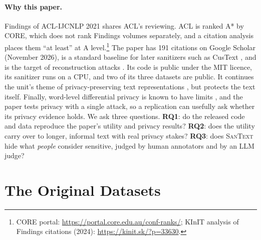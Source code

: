 \documentclass[11pt]{article}
\newcommand{\scholarcites}{191} %
\newcommand{\santext}{\textsc{SanText}}
\begin{document}
\paragraph{Why this paper.} Findings of ACL-IJCNLP 2021 shares ACL's reviewing. ACL is ranked A* by CORE, which does not rank Findings volumes separately, and a citation analysis places them ``at least'' at A level.\footnote{CORE portal: \url{https://portal.core.edu.au/conf-ranks/}; KInIT analysis of Findings citations (2024): \url{https://kinit.sk/?p=33630}.} The paper has \scholarcites{} citations on Google Scholar (November 2026), is a standard baseline for later sanitizers such as CusText \citep{chen-etal-2023-customized}, and is the target of reconstruction attacks \citep{tong-etal-2025-vulnerability}. Its code is public under the MIT licence, its sanitizer runs on a CPU, and two of its three datasets are public. It continues the unit's theme of privacy-preserving text representations \citep{li-etal-2018-towards}, but protects the text itself. Finally, word-level differential privacy is known to have limits \citep{mattern-etal-2022-limits}, and the paper tests privacy with a single attack, so a replication can usefully ask whether its privacy evidence holds.
We ask three questions. \textbf{RQ1}: do the released code and data reproduce the paper's utility and privacy results? \textbf{RQ2}: does the utility carry over to longer, informal text with real privacy stakes? \textbf{RQ3}: does \santext{} hide what \emph{people} consider sensitive, judged by human annotators and by an LLM judge?

\section{The Original Datasets}
\label{sec:datasets}
\end{document}

